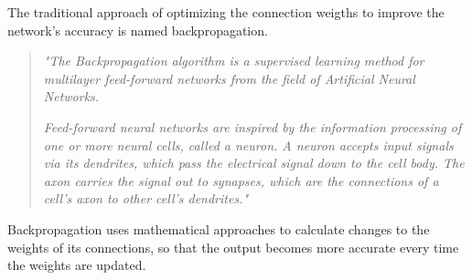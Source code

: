 The traditional approach of optimizing the connection weigths to improve the network's accuracy is named backpropagation.

\begin{quote}
\emph{"The Backpropagation algorithm is a supervised learning method for multilayer feed-forward networks from the field of Artificial Neural Networks. }

\emph{Feed-forward neural networks are inspired by the information processing of one or more neural cells, called a neuron. A neuron accepts input signals via its dendrites, which pass the electrical signal down to the cell body. The axon carries the signal out to synapses, which are the connections of a cell’s axon to other cell’s dendrites."} \cite{backprop_from_scratch} 
\end{quote}
	
Backpropagation uses mathematical approaches to calculate changes to the weights of its connections, so that the output becomes more accurate every time the weights are updated.